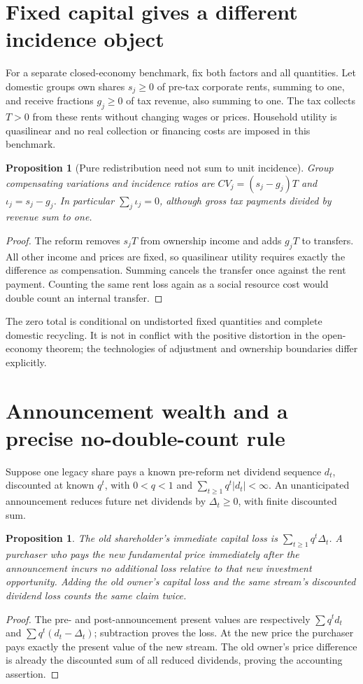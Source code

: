 \documentclass[11pt]{article}
\newtheorem{proposition}[theorem]{Proposition}
\theoremstyle{definition}
\begin{document}
\section*{Fixed capital gives a different incidence object}
For a separate closed-economy benchmark, fix both factors and all quantities.
Let domestic groups own shares $s_j\ge0$ of pre-tax corporate rents, summing
to one, and receive fractions $g_j\ge0$ of tax revenue, also summing to one.
The tax collects $T>0$ from these rents without changing wages or prices.
Household utility is quasilinear and no real collection or financing costs
are imposed in this benchmark.
\begin{proposition}[Pure redistribution need not sum to unit incidence]
Group compensating variations and incidence ratios are
$CV_j=(s_j-g_j)T$ and $\iota_j=s_j-g_j$. In particular
$\sum_j\iota_j=0$, although gross tax payments divided by revenue sum to one.
\end{proposition}
\begin{proof}
The reform removes $s_jT$ from ownership income and adds $g_jT$ to transfers.
All other income and prices are fixed, so quasilinear utility requires exactly
the difference as compensation. Summing cancels the transfer once against
the rent payment. Counting the same rent loss again as a social resource cost
would double count an internal transfer.
\end{proof}

The zero total is conditional on undistorted fixed quantities and complete
domestic recycling. It is not in conflict with the positive distortion in
the open-economy theorem; the technologies of adjustment and ownership
boundaries differ explicitly.

\section*{Announcement wealth and a precise no-double-count rule}
Suppose one legacy share pays a known pre-reform net dividend sequence
$d_t$, discounted at known $q^t$, with $0<q<1$ and
$\sum_{t\ge1}q^t|d_t|<\infty$. An unanticipated announcement
reduces future net dividends by $\Delta_t\ge0$, with finite discounted sum.
\begin{proposition}
The old shareholder's immediate capital loss is
$\sum_{t\ge1}q^t\Delta_t$. A purchaser who pays the new fundamental price
immediately after the announcement incurs no additional loss relative to
that new investment opportunity. Adding the old owner's capital loss and
the same stream's discounted dividend loss counts the same claim twice.
\end{proposition}
\begin{proof}
The pre- and post-announcement present values are respectively
$\sum q^td_t$ and $\sum q^t(d_t-\Delta_t)$; subtraction proves the loss.
At the new price the purchaser pays exactly the present value of the new
stream. The old owner's price difference is already the discounted sum of
all reduced dividends, proving the accounting assertion.
\end{proof}
\end{document}
